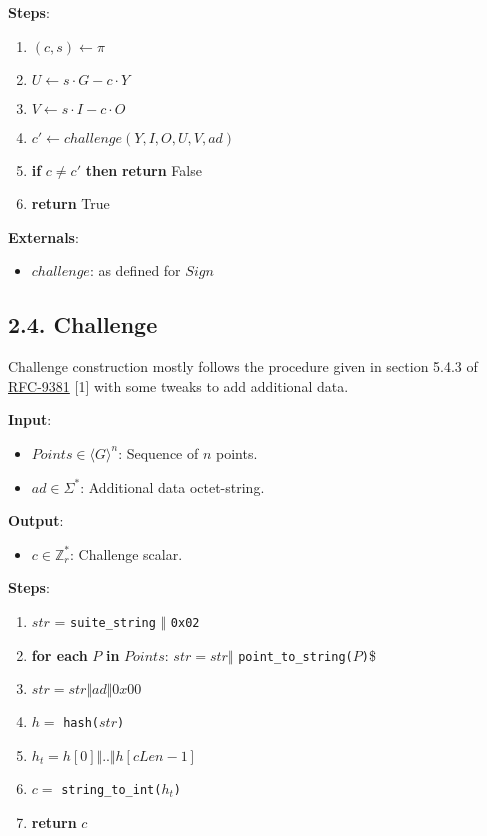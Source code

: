 \documentclass[
]{article}
\providecommand{\tightlist}{%
  \setlength{\itemsep}{0pt}\setlength{\parskip}{0pt}}
\begin{document}
\textbf{Steps}:

\begin{enumerate}
\def\labelenumi{\arabic{enumi}.}
\tightlist
\item
  \((c, s) \leftarrow \pi\)
\item
  \(U \leftarrow s \cdot G - c \cdot Y\)
\item
  \(V \leftarrow s \cdot I - c \cdot O\)
\item
  \(c' \leftarrow challenge(Y, I, O, U, V, ad)\)
\item
  \textbf{if} \(c \neq c'\) \textbf{then} \textbf{return} False
\item
  \textbf{return} True
\end{enumerate}

\textbf{Externals}:

\begin{itemize}
\tightlist
\item
  \(challenge\): as defined for \(Sign\)
\end{itemize}

\hypertarget{challenge}{%
\subsection{2.4. Challenge}\label{challenge}}

Challenge construction mostly follows the procedure given in section
5.4.3 of \href{https://datatracker.ietf.org/doc/rfc9381}{RFC-9381}
{[}1{]} with some tweaks to add additional data.

\textbf{Input}:

\begin{itemize}
\tightlist
\item
  \(Points \in \langle G \rangle^n\): Sequence of \(n\) points.
\item
  \(ad \in \Sigma^*\): Additional data octet-string.
\end{itemize}

\textbf{Output}:

\begin{itemize}
\tightlist
\item
  \(c \in \mathbb{Z}^*_r\): Challenge scalar.
\end{itemize}

\textbf{Steps}:

\begin{enumerate}
\def\labelenumi{\arabic{enumi}.}
\tightlist
\item
  \(str\) = \texttt{suite\_string} \(\Vert\) \texttt{0x02}
\item
  \textbf{for each} \(P\) \textbf{in} \(Points\): \(str = str \Vert\)
  \texttt{point\_to\_string(}\(P\)\texttt{)}\$
\item
  \(str = str \Vert ad \Vert 0x00\)
\item
  \(h =\) \texttt{hash(}\(str\)\texttt{)}
\item
  \(h_t = h[0] \Vert .. \Vert h[cLen - 1]\)
\item
  \(c =\) \texttt{string\_to\_int(}\(h_t\)\texttt{)}
\item
  \textbf{return} \(c\)
\end{enumerate}
\end{document}
